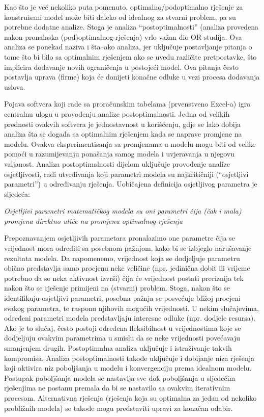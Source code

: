 \documentclass[a4paper, utf8, 11pt, colorlinks]{book}
\begin{document}
Kao što je već nekoliko puta pomenuto,  optimalno/podoptimalno rješenje za konstruisani model može biti daleko od idealnog za stvarni problem, pa su potrebne dodatne analize. Stoga je analiza ``postoptimalnosti'' (analiza provedena nakon pronalaska (pod)optimalnog rješenja) vrlo važan dio OR studija.  Ova analiza se ponekad naziva i šta--ako analiza, jer uključuje postavljanje pitanja o tome što bi bilo sa optimalnim rješenjem ako se uvedu različite pretpostavke, što implicira dodavanje novih ograničenja u postojeći model. Ova pitanja često postavlja uprava (firme) koja će donijeti konačne odluke u vezi procesa dodavanja uslova. %

Pojava softvera koji rade sa proračunskim tabelama (prvenstveno Excel-a) igra centralnu ulogu u provođenju analize postoptimalnosti. Jedna od velikih prednosti ovakvih softvera je jednostavnost u korišćenju, gdje se lako dobija analiza šta se događa sa optimalnim rješenjem kada se naprave promjene na modelu.  Ovakva eksperimentisanja sa promjenama u modelu mogu biti od velike pomoći u razumijevanju ponašanja samog modela i uvjeravanja u njegovu valjanost.  Analiza postoptimalnosti dijelom  uključuje provođenje analize osjetljivosti, radi utvrđivanja koji parametri modela su najkritičniji (``osjetljivi parametri'') u određivanju rješenja. Uobičajena definicija osjetljivog parametra je sljedeća:

\emph{Osjetljivi parametri matematičkog modela su oni parametri čija (čak i mala) promjena direktno utiče na promjenu optimalnog rješenja}

Prepoznavanjem osjetljivih parametara pronalazimo one parametre čija se vrijednost mora odrediti sa posebnom pažnjom, kako bi se izbjeglo narušavanje rezultata modela. Da napomenemo, vrijednost koja se dodjeljuje parametru obično predstavlja samo procjenu neke veličine
(npr. jedinična dobit ili vrijeme potrebno da se neka aktivnost izvrši) čija će vrijednost postati preciznija tek nakon što se rješenje primijeni na (stvarni) problem. Stoga, nakon
što se identifikuju osjetljivi parametri, posebna pažnja se posvećuje bližoj procjeni svakog parametra, te  rasponu njihovih mogućih vrijednosti.  U nekim slučajevima, određeni parametri modela predstavljaju interesne odluke (npr. dodjele resursa). Ako je to slučaj, često postoji određena fleksibilnost u vrijednostima koje se dodjeljuju ovakvim parametrima u smislu da se neke vrijednosti povećavaju smanjenjem drugih. Postoptimalna analiza uključuje i istraživanje takvih kompromisa. Analiza postoptimalnosti takođe uključuje i dobijanje niza rješenja koji aktivira niz poboljšanja u modelu i konvergenciju prema idealnom modelu. Postupak poboljšanja modela se nastavlja sve dok    poboljšanja u sljedećim rješenjima ne postanu premala da bi se nastavilo sa ovakvim iterativnim procesom.   Alternativna rješenja (rješenja koja su optimalna za jedan od nekoliko probližnih modela) se takođe mogu predstaviti upravi za konačan odabir. 
\end{document}
